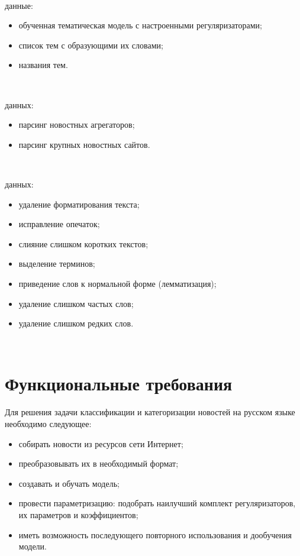 ~\

 данные:

\begin{itemize}
    \item обученная тематическая модель с настроенными регуляризаторами;
    \item список тем с образующими их словами;
    \item \todo{}названия тем.
\end{itemize}

~\

 данных:

\begin{itemize}
    \item парсинг новостных агрегаторов;
    \item парсинг крупных новостных сайтов.
\end{itemize}

~\

 данных:

\begin{itemize}
    \item удаление форматирования текста;
    \item исправление опечаток;
    \item слияние слишком коротких текстов;
    \item выделение терминов;
    \item приведение слов к нормальной форме (лемматизация);
    \item удаление слишком частых слов;
    \item удаление слишком редких слов.
\end{itemize}

~\



%
\section{Функциональные требования}

Для решения задачи классификации и категоризации новостей на русском языке необходимо следующее: 

\begin{itemize}
    \item собирать новости из ресурсов сети Интернет;
    \item преобразовывать их в необходимый формат;
    \item создавать и обучать модель;
    \item провести параметризацию: подобрать наилучший комплект регуляризаторов, их параметров и коэффициентов;
    \item иметь возможность последующего повторного использования и дообучения модели.
\end{itemize}

\todo{}

